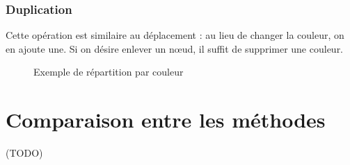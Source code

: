 \subsubsection{Duplication}
Cette opération est similaire au déplacement : au lieu de changer la couleur, on en ajoute une. Si on désire enlever un nœud, il suffit de supprimer une couleur.

\begin{figure}[h]
\centering

\caption{Exemple de répartition par couleur} 
\end{figure}

\section{Comparaison entre les méthodes}
(TODO)